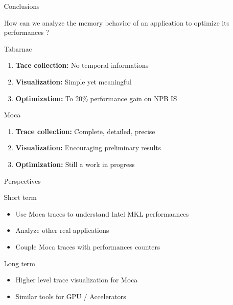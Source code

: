 \documentclass[xcolor={usenames,dvipsnames},hyperref={pdfusetitle}]{beamer}
\begin{document}
\begin{frame}{Conclusions}
    \begin{alertblock}{}
        How can we analyze the memory behavior of an application to optimize its performances ?
    \end{alertblock}
    \pause
    \begin{block}{Tabarnac~\cite{Beniamine15TABARNAC}}
        \begin{enumerate}
            \item \textbf{Tace collection:} No temporal informations
            \item \textbf{Visualization:} Simple yet meaningful
            \item \textbf{Optimization:} To 20\% performance gain on NPB IS
        \end{enumerate}           
    \end{block}
    \pause
    \begin{alertblock}{Moca~\cite{Beniamine15Memory,Beniamine16Moca}}
        \begin{enumerate}
            \item \textbf{Trace collection:} Complete, detailed, precise
            \item \textbf{Visualization:} Encouraging preliminary results
            \item \textbf{Optimization:} Still a work in progress
        \end{enumerate}          
    \end{alertblock}
\end{frame}

\begin{frame}{Perspectives}
    \begin{block}{Short term}
        \begin{itemize}
            \item Use Moca traces to understand Intel MKL performaances
            \item Analyze other real applications
            \item Couple Moca traces with performances counters
        \end{itemize}
    \end{block}
    \pause
    \begin{alertblock}{Long term}
        \begin{itemize}
            \item Higher level trace visualization for Moca
            \item Similar tools for GPU / Accelerators
        \end{itemize}
    \end{alertblock}
\end{frame}
\end{document}
